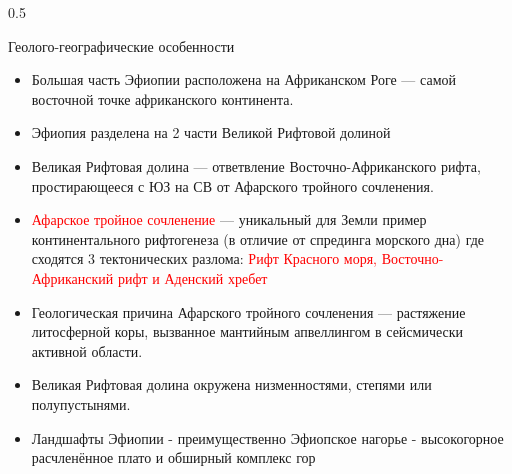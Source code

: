 \documentclass[pdflatex,compress,8pt,
	xcolor={dvipsnames,dvipsnames,svgnames,x11names,table},
	hyperref={colorlinks = true, breaklinks = true, urlcolor = NavyBlue, linkcolor=white, breaklinks = true}]{beamer}
\begin{document}
\begin{frame}
\begin{minipage}[0.5\textheight]{\textwidth}
\begin{columns}[T]
\begin{column}{0.5\textwidth}
\begin{alertblock}{Геолого-географические особенности}
\begin{itemize}\footnotesize
    \item Большая часть Эфиопии расположена на Африканском Роге — самой восточной точке африканского континента.
\item Эфиопия разделена на 2 части Великой Рифтовой долиной
\item Великая Рифтовая долина — ответвление Восточно-Африканского рифта, простирающееся с ЮЗ на СВ от Афарского тройного сочленения.
\item \textcolor{red}{Афарское тройное сочленение} — уникальный для Земли пример континентального рифтогенеза (в отличие от спрединга морского дна) где сходятся 3 тектонических разлома: \textcolor{red}{Рифт Красного моря, Восточно-Африканский рифт и Аденский хребет}
\item Геологическая причина Афарского тройного сочленения — растяжение литосферной коры, вызванное мантийным апвеллингом в сейсмически активной области.
\item Великая Рифтовая долина окружена низменностями, степями или полупустынями.
\item Ландшафты Эфиопии - преимущественно Эфиопское нагорье - высокогорное расчленённое плато и обширный комплекс гор
\end{itemize}
\end{alertblock}
\end{column}
\end{columns}
\end{minipage}
\end{frame}

\end{document}
